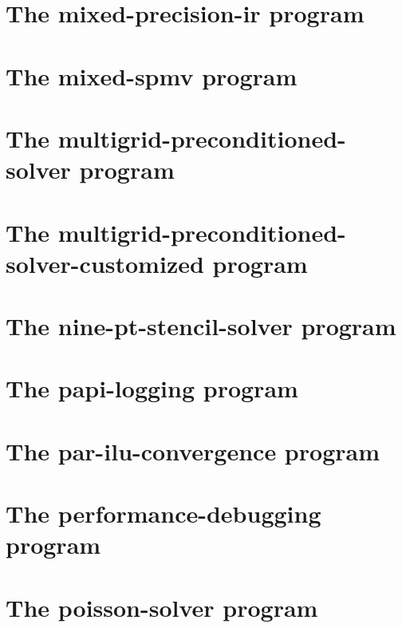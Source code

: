 \let\mypdfximage\pdfximage\def\pdfximage{\immediate\mypdfximage}\documentclass[twoside]{book}
\newcommand{\+}{\discretionary{\mbox{\scriptsize$\hookleftarrow$}}{}{}}
\begin{document}
\chapter{The mixed-\/precision-\/ir program}
\label{mixed_precision_ir}

\chapter{The mixed-\/spmv program}
\label{mixed_spmv}

\chapter{The multigrid-\/preconditioned-\/solver program}
\label{multigrid_preconditioned_solver}

\chapter{The multigrid-\/preconditioned-\/solver-\/customized program}
\label{multigrid_preconditioned_solver_customized}

\chapter{The nine-\/pt-\/stencil-\/solver program}
\label{nine_pt_stencil_solver}

\chapter{The papi-\/logging program}
\label{papi_logging}

\chapter{The par-\/ilu-\/convergence program}
\label{par_ilu_convergence}

\chapter{The performance-\/debugging program}
\label{performance_debugging}

\chapter{The poisson-\/solver program}
\label{poisson_solver}

\end{document}
